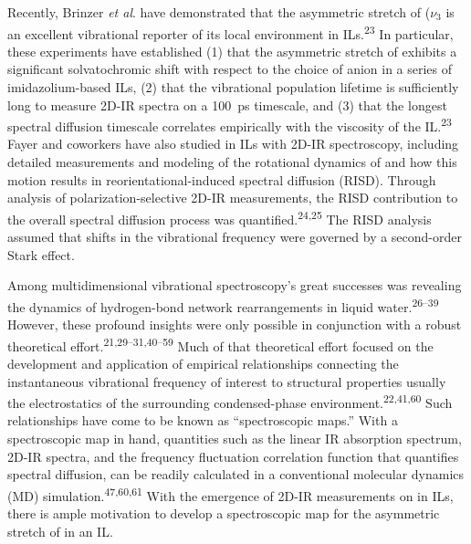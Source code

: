 Recently, Brinzer \emph{et al}. have demonstrated that the asymmetric stretch of  (\(\nu_3\) is an excellent vibrational reporter of its local environment in ILs.\textsuperscript{23} In particular, these experiments have established (1) that the asymmetric stretch of  exhibits a significant solvatochromic shift with respect to the choice of anion in a series of imidazolium-based ILs, (2) that the  vibrational population lifetime is sufficiently long to measure 2D-IR spectra on a \SI{100}{\pico\second} timescale, and (3) that the longest spectral diffusion timescale correlates empirically with the viscosity of the IL.\textsuperscript{23} Fayer and coworkers have also studied  in ILs with 2D-IR spectroscopy, including detailed measurements and modeling of the rotational dynamics of  and how this motion results in reorientational-induced spectral diffusion (RISD). Through analysis of polarization-selective 2D-IR measurements, the RISD contribution to the overall spectral diffusion process was quantified.\textsuperscript{24,25} The RISD analysis assumed that shifts in the  vibrational frequency were governed by a second-order Stark effect.

Among multidimensional vibrational spectroscopy's great successes was revealing the dynamics of hydrogen-bond network rearrangements in liquid water.\textsuperscript{26--39} However, these profound insights were only possible in conjunction with a robust theoretical effort.\textsuperscript{21,29--31,40--59} Much of that theoretical effort focused on the development and application of empirical relationships connecting the instantaneous vibrational frequency of interest to structural properties \textemdash{} usually the electrostatics \textemdash{} of the surrounding condensed-phase environment.\textsuperscript{22,41,60} Such relationships have come to be known as ``spectroscopic maps.'' With a spectroscopic map in hand, quantities such as the linear IR absorption spectrum, 2D-IR spectra, and the frequency fluctuation correlation function that quantifies spectral diffusion, can be readily calculated in a conventional molecular dynamics (MD) simulation.\textsuperscript{47,60,61} With the emergence of 2D-IR measurements on  in ILs, there is ample motivation to develop a spectroscopic map for the asymmetric stretch of  in an IL.

